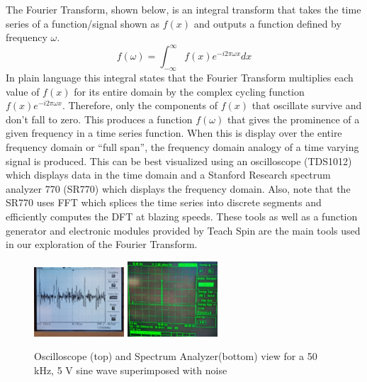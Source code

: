 \documentclass[prl,twocolumn,superscriptaddress,floatfix]{revtex4}
\begin{document}
The Fourier Transform, shown below, is an integral transform that takes the time series of a function/signal shown as $f(x)$ and outputs a function defined by frequency $\omega$. 
\begin{equation}
f(\omega) = \int_{-\infty}^{\infty} f(x)e^{-i2\pi \omega x}dx  \label{firstequation}
\end{equation}
In plain language this integral states that the Fourier Transform multiplies each value of $f(x)$ for its entire domain by the complex cycling function $f(x)e^{-i2\pi \omega x}$. Therefore, only the components of $f(x)$ that oscillate survive and don't fall to zero. This produces a function $f(\omega)$ that gives the prominence of a given frequency in a time series function. When this is display over the entire frequency domain or ``full span'', the frequency domain analogy of a time varying signal is produced.
This can be best visualized using an oscilloscope (TDS1012) which displays data in the time domain and a Stanford Research spectrum analyzer 770 (SR770) which displays the frequency domain.
Also, note that the SR770 uses FFT which splices the time series into discrete segments and efficiently computes the DFT at blazing speeds. These tools as well as a function generator and electronic modules provided
by Teach Spin are the main tools used in our exploration of the Fourier Transform.

\begin{figure}[H]
    \begin{center}
    \includegraphics[width = 0.3\textwidth]{Time Data.jpg}
    \includegraphics[width = 0.3\textwidth]{Basic Sinusodial.jpg}
    \caption{\label{fig:1}Oscilloscope (top) and Spectrum Analyzer(bottom) view for a 50 kHz, 5 V sine wave superimposed with noise}
    \end{center}
\end{figure}
\end{document}
